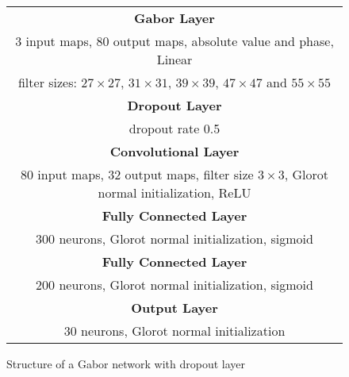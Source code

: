 \begin{figure}[h!]
	\scriptsize
	\centering
	\begin{tabular}{|c|}
	\hline
		\textbf{Gabor Layer}\\
		3 input maps, 80 output maps, absolute value and phase, Linear\\
		filter sizes: $27 \times 27$, $31 \times 31$, $39 \times 39$, $47 \times 47$ and $55 \times 55$\\
	\hline
		\textbf{Dropout Layer}\\
		dropout rate 0.5\\
	\hline
		\textbf{Convolutional Layer}\\
		80 input maps, 32 output maps, filter size $3\times3$, Glorot normal initialization, \ac{ReLU}\\
	\hline
		\textbf{Fully Connected Layer}\\
		300 neurons, Glorot normal initialization, sigmoid\\
	\hline
		\textbf{Fully Connected Layer}\\
		200 neurons, Glorot normal initialization, sigmoid\\
	\hline
		\textbf{Output Layer}\\
		30 neurons, Glorot normal initialization\\
	\hline
	\end{tabular}
	\caption{Structure of a Gabor network with dropout layer}
	\label{fig:gabor_structure_dropout}
\end{figure}
